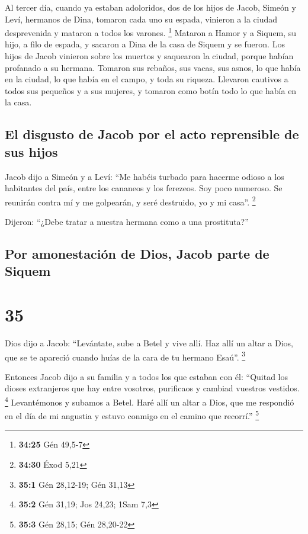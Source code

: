  Al tercer día, cuando ya estaban adoloridos, dos de los
hijos de Jacob, Simeón y Leví, hermanos de Dina, tomaron cada uno su
espada, vinieron a la ciudad desprevenida y mataron a todos los varones.
\footnote{\textbf{34:25} Gén 49,5-7}  Mataron a Hamor y a
Siquem, su hijo, a filo de espada, y sacaron a Dina de la casa de Siquem
y se fueron.  Los hijos de Jacob vinieron sobre los
muertos y saquearon la ciudad, porque habían profanado a su hermana.
 Tomaron sus rebaños, sus vacas, sus asnos, lo que había
en la ciudad, lo que había en el campo,  y toda su
riqueza. Llevaron cautivos a todos sus pequeños y a sus mujeres, y
tomaron como botín todo lo que había en la casa.

\hypertarget{el-disgusto-de-jacob-por-el-acto-reprensible-de-sus-hijos}{%
\subsection{El disgusto de Jacob por el acto reprensible de sus
hijos}\label{el-disgusto-de-jacob-por-el-acto-reprensible-de-sus-hijos}}

 Jacob dijo a Simeón y a Leví: ``Me habéis turbado para
hacerme odioso a los habitantes del país, entre los cananeos y los
ferezeos. Soy poco numeroso. Se reunirán contra mí y me golpearán, y
seré destruido, yo y mi casa''. \footnote{\textbf{34:30} Éxod 5,21}

 Dijeron: ``¿Debe tratar a nuestra hermana como a una
prostituta?''

\hypertarget{por-amonestaciuxf3n-de-dios-jacob-parte-de-siquem}{%
\subsection{Por amonestación de Dios, Jacob parte de
Siquem}\label{por-amonestaciuxf3n-de-dios-jacob-parte-de-siquem}}

\hypertarget{section-34}{%
\section{35}\label{section-34}}

 Dios dijo a Jacob: ``Levántate, sube a Betel y vive allí.
Haz allí un altar a Dios, que se te apareció cuando huías de la cara de
tu hermano Esaú''. \footnote{\textbf{35:1} Gén 28,12-19; Gén 31,13}

 Entonces Jacob dijo a su familia y a todos los que
estaban con él: ``Quitad los dioses extranjeros que hay entre vosotros,
purificaos y cambiad vuestros vestidos. \footnote{\textbf{35:2} Gén
  31,19; Jos 24,23; 1Sam 7,3}  Levantémonos y subamos a
Betel. Haré allí un altar a Dios, que me respondió en el día de mi
angustia y estuvo conmigo en el camino que recorrí.'' \footnote{\textbf{35:3}
  Gén 28,15; Gén 28,20-22}

